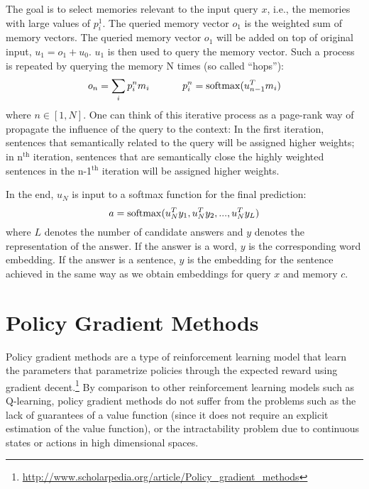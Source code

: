 The goal is to select memories relevant to the input query $x$, i.e., the memories with large values of $p_i^1$. The queried memory vector $o_1$ is the weighted sum of memory vectors.
The queried memory vector $o_1$ will be added on top of original input, $u_1=o_1+u_0$.
$u_1$ is then used to query the memory vector.
Such a process is repeated by querying the memory N times (so called ``hops''):
\begin{equation}
o_n=\sum_{i}p_i^n m_{i} ~~~~~~~~~~p_i^n=\operatorname{softmax}(u_{n-1}^T m_i)
\end{equation}
where $n\in [1,N]$.
 One can think of this iterative process as a page-rank way of propagate the influence of the query to the context:
In the first iteration, sentences that semantically related to the query will be assigned higher weights; 
in n$^{\text{th}}$  iteration, sentences that are semantically close the highly weighted sentences in the n-1$^{\text{th}}$ iteration will be assigned higher weights. 

In the end, $u_N$ is input to a softmax function for the final prediction:
\begin{equation}
a=\operatorname{softmax} (u_N^T y_1,u_N^T y_2,...,u_N^T y_L)
\end{equation}
where $L$ denotes the number of candidate answers and $y$ denotes the representation of the answer. If the answer is a word, $y$ is the corresponding word embedding. If the answer is a sentence, $y$ is the embedding for the sentence achieved in the same way as we obtain embeddings for query $x$ and memory $c$.

\section{Policy Gradient Methods}
Policy gradient methods \cite{aleksandrov1968stochastic,williams1992simple} are a type of reinforcement learning model that 
learn the parameters that parametrize policies through the expected reward using gradient decent.\footnote{\url{http://www.scholarpedia.org/article/Policy_gradient_methods}}
By comparison to other reinforcement learning models such as Q-learning, policy gradient methods do not suffer from the problems such as the 
lack of guarantees of a value function (since it does not require an explicit estimation of the value function), or the intractability problem due to continuous states or actions  in high dimensional spaces.

